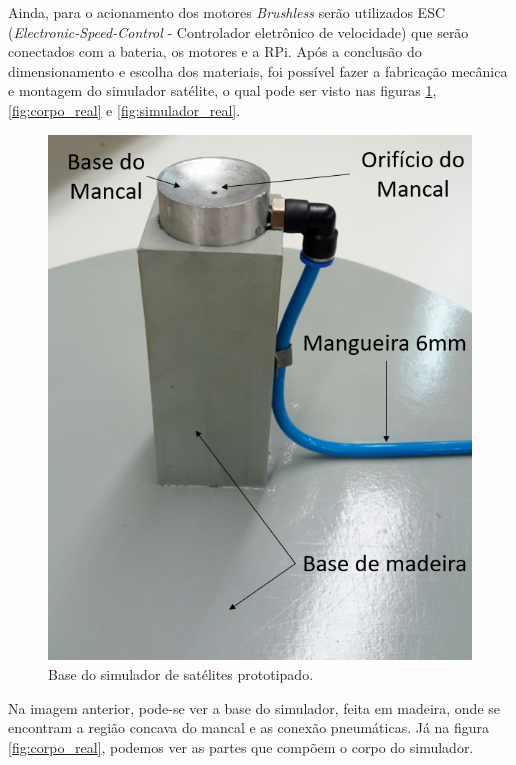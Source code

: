 Ainda, para o acionamento dos motores \textit{Brushless} serão utilizados ESC (\textit{Electronic-Speed-Control} - Controlador eletrônico de velocidade) que serão conectados com a bateria, os motores e a RPi. Após a conclusão do dimensionamento e escolha dos materiais, foi possível fazer a fabricação mecânica e montagem do simulador satélite, o qual pode ser visto nas figuras \ref{fig:base_real}, \ref{fig:corpo_real} e \ref{fig:simulador_real}.

\begin{figure}[H]
  \caption{Base do simulador de satélites prototipado.}
  \begin{center}
      \includegraphics[scale=.5]{metodologia/img/base_real}
  \end{center}
  \label{fig:base_real}
\end{figure}

Na imagem anterior, pode-se ver a base do simulador, feita em madeira, onde se encontram a região concava do mancal e as conexão 
pneumáticas. Já na figura \ref{fig:corpo_real}, podemos ver as partes que compõem o corpo do simulador.


